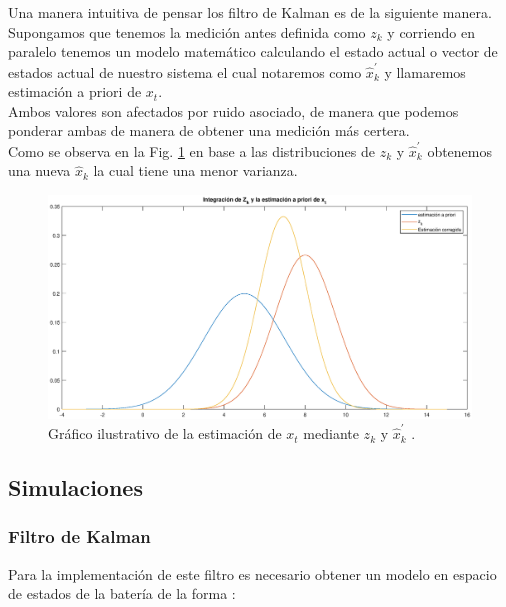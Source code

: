\documentclass[10pt,a4paper]{article}
\begin{document}
	
	Una manera intuitiva de pensar los filtro de Kalman es de la siguiente manera.
	Supongamos que tenemos la medición antes definida como $z_k$ y corriendo en paralelo tenemos un modelo matemático calculando el estado actual o vector de estados actual de nuestro sistema el cual notaremos como $\hat{x}^\prime_k$ y llamaremos estimación a priori de $x_{t}$.\\
	
	Ambos valores son afectados por ruido asociado, de manera que podemos ponderar ambas de manera de obtener una medición más certera.\\
	
	Como se observa en la Fig. \ref{KF_Integration_concept} en base a las distribuciones de $z_k$ y $\hat{x}^\prime_k$ obtenemos una nueva $\hat{x}_k$ la cual tiene una menor varianza.\\
	
	\begin{figure}[h!]
		\begin{center}
			\includegraphics[width=1\textwidth]{KF_Integration_concept.eps}
			\caption{Gráfico ilustrativo de la estimación de $x_{t}$ mediante $z_k$ y $\hat{x}^\prime_k$ .}
			\label{KF_Integration_concept}
		\end{center}
	\end{figure}
	
	
	\clearpage
	
	\subsection{Simulaciones}
	\subsubsection{Filtro de Kalman}
	Para la implementación de este filtro es necesario obtener un modelo en espacio de estados de la batería de la forma :
	
\end{document}
